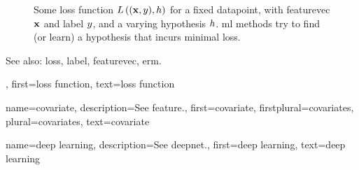{{\begin{figure}[H]
\begin{center}
\begin{tikzpicture}[scale = 0.7,%
        				every axis/.append style={
          			axis line style={-Latex, thick},
          			tick style={thick}
        				}]
				\end{tikzpicture}
			\end{center}
			\vspace*{-7mm}
		\caption{Some \gls{loss} \gls{function} $L\left(({\bf x},y),h \right)$ for a fixed \gls{datapoint}, with 
			\gls{featurevec} ${\bf x}$ and \gls{label} $y$, and a varying \gls{hypothesis} $h$. 
			\gls{ml} methods try to find (or learn) a \gls{hypothesis} that incurs minimal \gls{loss}.}
			\label{fig_loss_function_gls_dict}
		\end{figure}
		See also: \gls{loss}, \gls{label}, \gls{featurevec}, \gls{erm}.},
 	first={loss function},
 	text={loss function} 
}

{name={covariate},
	description={See \gls{feature}.}, 
	first={covariate},
	firstplural={covariates},
	plural={covariates}, 
	text={covariate}
}

{name={deep learning},
	description={See \gls{deepnet}.},
	first={deep learning},
	text={deep learning}
}

